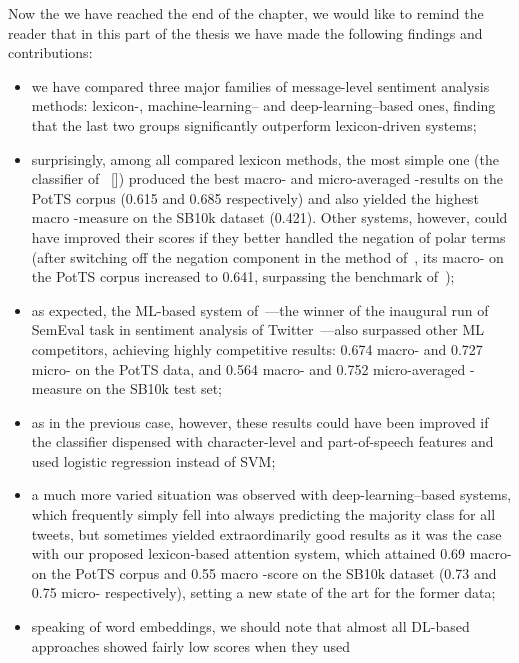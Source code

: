 Now the we have reached the end of the chapter, we would like to
remind the reader that in this part of the thesis we have made the
following findings and contributions:
\begin{itemize}
  \item we have compared three major families of message-level
    sentiment analysis methods: lexicon-, machine-learning-- and
    deep-learning--based ones, finding that the last two groups
    significantly outperform lexicon-driven systems;
  \item surprisingly, among all compared lexicon methods, the most
    simple one (the classifier of~\citeauthor{Hu:04}
    [\citeyear{Hu:04}]) produced the best macro- and micro-averaged
    \F{}-results on the PotTS corpus (0.615 and 0.685 respectively)
    and also yielded the highest macro \F{}-measure on the SB10k
    dataset (0.421).  Other systems, however, could have improved
    their scores if they better handled the negation of polar terms
    (after switching off the negation component in the method
    of~\citeauthor{Musto:14}, its macro-\F{} on the PotTS corpus
    increased to 0.641, surpassing the benchmark
    of~\citeauthor{Hu:04});
  \item as expected, the ML-based system of~\citet{Mohammad:13}---the
    winner of the inaugural run of SemEval task in sentiment analysis
    of Twitter~\cite{Nakov:13}---also surpassed other ML competitors,
    achieving highly competitive results: 0.674 macro- and 0.727
    micro-\F{} on the PotTS data, and 0.564 macro- and 0.752
    micro-averaged \F{}-measure on the SB10k test set;
  \item as in the previous case, however, these results could have
    been improved if the classifier dispensed with character-level and
    part-of-speech features and used logistic regression instead of
    SVM;
  \item a much more varied situation was observed with
    deep-learning--based systems, which frequently simply fell into
    always predicting the majority class for all tweets, but sometimes
    yielded extraordinarily good results as it was the case with our
    proposed lexicon-based attention system, which attained 0.69
    macro-\F{} on the PotTS corpus and 0.55 macro \F{}-score on the
    SB10k dataset (0.73 and 0.75 micro-\F{} respectively), setting a
    new state of the art for the former data;
  \item speaking of word embeddings, we should note that almost all
    DL-based approaches showed fairly low scores when they used

\end{itemize}
